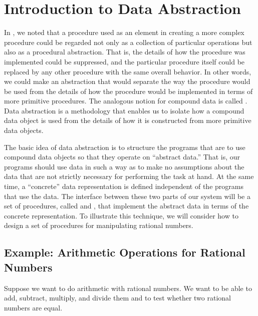 \section{Introduction to Data Abstraction}
\label{Section 2.1}

In , we noted that a procedure used as an element in creating a more complex procedure could be regarded not only as a collection of particular operations but also as a procedural abstraction.
That is, the details of how the procedure was implemented could be suppressed, and the particular procedure itself could be replaced by any other procedure with the same overall behavior.
In other words, we could make an abstraction that would separate the way the procedure would be used from the details of how the procedure would be implemented in terms of more primitive procedures.
The analogous notion for compound data is called .
Data abstraction is a methodology that enables us to isolate how a compound data object is used from the details of how it is constructed from more primitive data objects.

The basic idea of data abstraction is to structure the programs that are to use compound data objects so that they operate on “abstract data.”
That is, our programs should use data in such a way as to make no assumptions about the data that are not strictly necessary for performing the task at hand.
At the same time, a “concrete” data representation is defined independent of the programs that use the data.
The interface between these two parts of our system will be a set of procedures, called  and , that implement the abstract data in terms of the concrete representation.
To illustrate this technique, we will consider how to design a set of procedures for manipulating rational numbers.



\subsection{Example: Arithmetic Operations for Rational Numbers}
\label{Section 2.1.1}

Suppose we want to do arithmetic with rational numbers.
We want to be able to add, subtract, multiply, and divide them and to test whether two rational numbers are equal.

